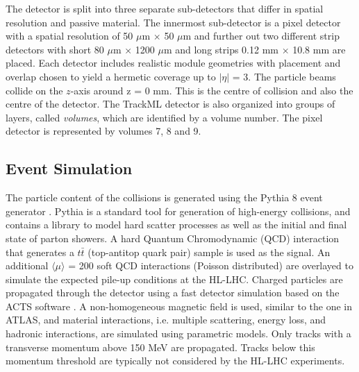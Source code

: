 The detector is split into three separate sub-detectors that differ in spatial resolution and passive material. The innermost sub-detector is a pixel detector with a spatial resolution of 50 $\mu$m $\times$ 50 $\mu$m and further out two different strip detectors with short 80 $\mu$m × 1200 $\mu$m and long strips 0.12 mm $\times$ 10.8 mm are placed. Each detector includes realistic module geometries with placement and overlap chosen to yield a hermetic coverage up to $\lvert \eta \rvert$ = 3. The particle beams collide on the $z$-axis around z = 0 mm. This is the centre of collision and also the centre of the detector. The TrackML detector is also organized into groups of layers, called \textit{volumes}, which are identified by a volume number. The pixel detector is represented by volumes 7, 8 and 9.






\subsection{Event Simulation}
\label{trackml-simulation}
The particle content of the collisions is generated using the Pythia 8 event generator \cite{pythia-8}. Pythia is a standard tool for generation of high-energy collisions, and contains a library to model hard scatter processes as well as the initial and final state of parton showers. A hard Quantum Chromodynamic (QCD) interaction that generates a $t\bar{t}$ (top-antitop quark pair) sample is used as the signal. An additional $\langle \mu \rangle$ = 200 soft QCD interactions (Poisson distributed) are overlayed to simulate the expected pile-up conditions at the HL-LHC. Charged particles are propagated through the detector using a fast detector simulation based on the ACTS software \cite{Gumpert_2017}. A non-homogeneous magnetic field is used, similar to the one in ATLAS, and material interactions, i.e. multiple scattering, energy loss, and hadronic interactions, are simulated using parametric models. Only tracks with a transverse momentum above 150 MeV are propagated. Tracks below this momentum threshold are typically not considered by the HL-LHC experiments.

